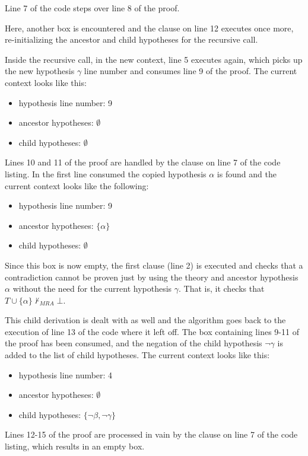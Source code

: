 \documentclass[11pt,twoside,a4paper]{report}
\begin{document}
Line 7 of the code steps over line 8 of the proof.

Here, another box is encountered and the clause on line 12 executes once more, re-initializing the ancestor and child hypotheses for the recursive call.

Inside the recursive call, in the new context, line 5 executes again, which picks up the new hypothesis $\gamma$ line number and consumes line 9 of the proof. The current context looks like this:
\begin{itemize}
\item
hypothesis line number: 9
\item
ancestor hypotheses: $\emptyset$
\item
child hypotheses: $\emptyset$
\end{itemize}

Lines 10 and 11 of the proof are handled by the clause on line 7 of the code listing. In the first line consumed the copied hypothesis $\alpha$ is found and the current context looks like the following: 
\begin{itemize}
\item
hypothesis line number: 9
\item
ancestor hypotheses: $\{\alpha\}$
\item
child hypotheses: $\emptyset$
\end{itemize}

Since this box is now empty, the first clause (line 2) is executed and checks that a contradiction cannot be proven just by using the theory and ancestor hypothesis $\alpha$ without the need for the current hypothesis $\gamma$. That is, it checks that $T\cup\{\alpha\}\nvdash_{MRA}\bot$.

This child derivation is dealt with as well and the algorithm goes back to the execution of line 13 of the code where it left off. The box containing lines 9-11 of the proof has been consumed, and the negation of the child hypothesis $\neg\gamma$ is added to the list of child hypotheses. The current context looks like this:
\begin{itemize}
\item
hypothesis line number: 4
\item
ancestor hypotheses: $\emptyset$
\item
child hypotheses: $\{\neg\beta, \neg\gamma\}$
\end{itemize}

Lines 12-15 of the proof are processed in vain by the clause on line 7 of the code listing, which results in an empty box.
\end{document}
